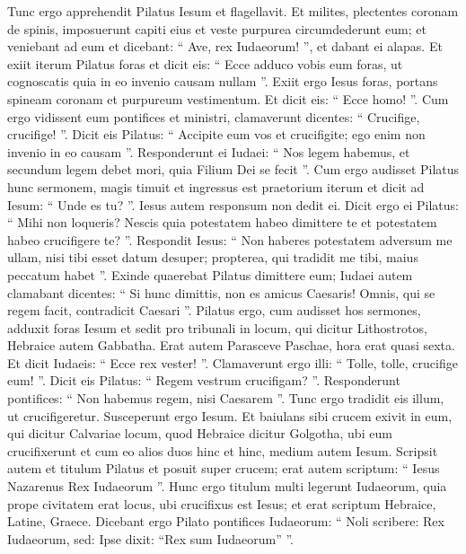 \begin{biblechapter}
\begin{biblechapter}
\begin{biblechapter}
\begin{biblechapter}
\begin{biblechapter}
\begin{biblechapter}
\begin{biblechapter}
\begin{biblechapter}
\begin{biblechapter}
\begin{biblechapter}
\begin{biblechapter}
\begin{biblechapter}
\begin{biblechapter}
\begin{biblechapter}
\begin{biblechapter}
\begin{biblechapter}
\begin{biblechapter}
\begin{biblechapter}
\begin{biblechapter}
\verse Tunc ergo apprehendit Pilatus Iesum et flagellavit. 
\verse Et milites, plectentes coronam de spinis, imposuerunt capiti eius et veste purpurea circumdederunt eum; 
\verse et veniebant ad eum et dicebant: “ Ave, rex Iudaeorum! ”, et dabant ei alapas. 
 \verse Et exiit iterum Pilatus foras et dicit eis: “ Ecce adduco vobis eum foras, ut cognoscatis quia in eo invenio causam nullam ”. 
\verse Exiit ergo Iesus foras, portans spineam coronam et purpureum vestimentum. Et dicit eis: “ Ecce homo! ”. 
 \verse Cum ergo vidissent eum pontifices et ministri, clamaverunt dicentes: “ Crucifige, crucifige! ”. Dicit eis Pilatus: “ Accipite eum vos et crucifigite; ego enim non invenio in eo causam ”. 
\verse Responderunt ei Iudaei: “ Nos legem habemus, et secundum legem debet mori, quia Filium Dei se fecit ”.
 \verse Cum ergo audisset Pilatus hunc sermonem, magis timuit 
\verse et ingressus est praetorium iterum et dicit ad Iesum: “ Unde es tu? ”. Iesus autem responsum non dedit ei. 
\verse Dicit ergo ei Pilatus: “ Mihi non loqueris? Nescis quia potestatem habeo dimittere te et potestatem habeo crucifigere te? ”. 
\verse Respondit Iesus: “ Non haberes potestatem adversum me ullam, nisi tibi esset datum desuper; propterea, qui tradidit me tibi, maius peccatum habet ”.
 \verse Exinde quaerebat Pilatus dimittere eum; Iudaei autem clamabant dicentes: “ Si hunc dimittis, non es amicus Caesaris! Omnis, qui se regem facit, contradicit Caesari ”. 
\verse Pilatus ergo, cum audisset hos sermones, adduxit foras Iesum et sedit pro tribunali in locum, qui dicitur Lithostrotos, Hebraice autem Gabbatha. 
\verse Erat autem Parasceve Paschae, hora erat quasi sexta. Et dicit Iudaeis: “ Ecce rex vester! ”. 
\verse Clamaverunt ergo illi: “ Tolle, tolle, crucifige eum! ”. Dicit eis Pilatus: “ Regem vestrum crucifigam? ”. Responderunt pontifices: “ Non habemus regem, nisi Caesarem ”. 
\verse Tunc ergo tradidit eis illum, ut crucifigeretur. Susceperunt ergo Iesum.
 \verse Et baiulans sibi crucem exivit in eum, qui dicitur Calvariae locum, quod Hebraice dicitur Golgotha, 
\verse ubi eum crucifixerunt et cum eo alios duos hinc et hinc, medium autem Iesum. 
\verse Scripsit autem et titulum Pilatus et posuit super crucem; erat autem scriptum: “ Iesus Nazarenus Rex Iudaeorum ”. 
 \verse Hunc ergo titulum multi legerunt Iudaeorum, quia prope civitatem erat locus, ubi crucifixus est Iesus; et erat scriptum Hebraice, Latine, Graece. 
\verse Dicebant ergo Pilato pontifices Iudaeorum: “ Noli scribere: Rex Iudaeorum, sed: Ipse dixit: “Rex sum Iudaeorum” ”. 

\end{biblechapter}
\end{biblechapter}
\end{biblechapter}
\end{biblechapter}
\end{biblechapter}
\end{biblechapter}
\end{biblechapter}
\end{biblechapter}
\end{biblechapter}
\end{biblechapter}
\end{biblechapter}
\end{biblechapter}
\end{biblechapter}
\end{biblechapter}
\end{biblechapter}
\end{biblechapter}
\end{biblechapter}
\end{biblechapter}
\end{biblechapter}
